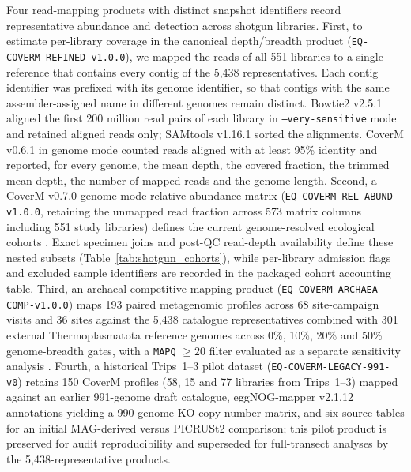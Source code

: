 \begin{revision}
Four read-mapping products with distinct snapshot identifiers record
representative abundance and detection across shotgun libraries. First, to
estimate per-library coverage in the canonical depth/breadth product
(\texttt{EQ-COVERM-REFINED-v1.0.0}), we mapped the reads of all 551
libraries to a single reference that contains every contig of the 5,438
representatives. Each contig identifier was prefixed with its genome
identifier, so that contigs with the same assembler-assigned name in
different genomes remain distinct. Bowtie2 v2.5.1 \cite{bowtie2} aligned
the first 200 million read pairs of each library in
\texttt{--very-sensitive} mode and retained aligned reads only; SAMtools
v1.16.1 \cite{samtools} sorted the alignments. CoverM v0.6.1
\cite{coverm} in genome mode counted reads aligned with at least 95\%
identity and reported, for every genome, the mean depth, the covered
fraction, the trimmed mean depth, the number of mapped reads and the
genome length. Second, a CoverM v0.7.0 genome-mode relative-abundance
matrix (\texttt{EQ-COVERM-REL-ABUND-v1.0.0}, retaining the unmapped read
fraction across 573 matrix columns including 551 study libraries) defines
the current genome-resolved ecological cohorts \cite{ecology_companion}.
Exact specimen joins and post-QC read-depth availability define these
nested subsets (Table~\ref{tab:shotgun_cohorts}), while per-library
admission flags and excluded sample identifiers are recorded in the
packaged cohort accounting table. Third, an
archaeal competitive-mapping product
(\texttt{EQ-COVERM-ARCHAEA-COMP-v1.0.0}) maps 193 paired metagenomic
profiles across 68 site-campaign visits and 36 sites against the 5,438
catalogue representatives combined with 301 external Thermoplasmatota
reference genomes across 0\%, 10\%, 20\% and 50\% genome-breadth gates,
with a \texttt{MAPQ} $\ge 20$ filter evaluated as a separate sensitivity
analysis \cite{proteome_companion}. Fourth, a historical Trips~1--3 pilot
dataset (\texttt{EQ-COVERM-LEGACY-991-v0}) retains 150 CoverM profiles
(58, 15 and 77 libraries from Trips~1--3) mapped against an earlier
991-genome draft catalogue, eggNOG-mapper v2.1.12 \cite{eggnog}
annotations yielding a 990-genome KO copy-number matrix, and six source
tables for an initial MAG-derived versus PICRUSt2 comparison; this pilot
product is preserved for audit reproducibility and superseded for
full-transect analyses by the 5,438-representative products.


\end{revision}

